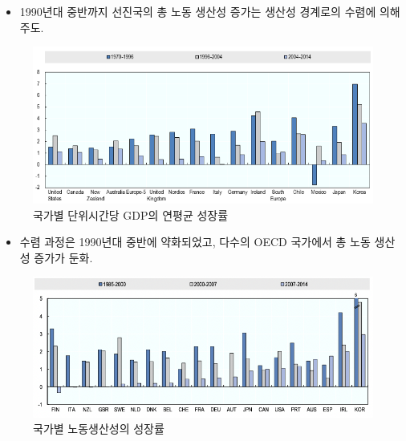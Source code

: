 \documentclass[aspectratio=169,xcolor=dvipsnames,handout]{beamer}
\begin{document}
\begin{frame}{}
    \begin{itemize}
        \item 1990년대 중반까지 선진국의 총 노동 생산성 증가는 생산성 경계로의 수렴에 의해 주도. 
    \end{itemize}
    \begin{figure}
        \centering
        \includegraphics[scale=.4]{pic/tpin1.1.png}
        \caption{국가별 단위시간당 GDP의 연평균 성장률}
    \end{figure}
\end{frame}

\begin{frame}{}
    \begin{itemize}
        \item 수렴 과정은 1990년대 중반에 약화되었고, 다수의 OECD 국가에서 총 노동 생산성 증가가 둔화.
    \end{itemize}
    \begin{figure}
        \centering
        \includegraphics[scale=.4]{pic/tpin1.2.1.png}
        \caption{국가별 노동생산성의 성장률}
    \end{figure}
\end{frame}
\end{document}
